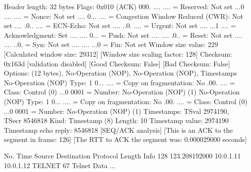     Header length: 32 bytes
    Flags: 0x010 (ACK)
        000. .... .... = Reserved: Not set
        ...0 .... .... = Nonce: Not set
        .... 0... .... = Congestion Window Reduced (CWR): Not set
        .... .0.. .... = ECN-Echo: Not set
        .... ..0. .... = Urgent: Not set
        .... ...1 .... = Acknowledgment: Set
        .... .... 0... = Push: Not set
        .... .... .0.. = Reset: Not set
        .... .... ..0. = Syn: Not set
        .... .... ...0 = Fin: Not set
    Window size value: 229
    [Calculated window size: 29312]
    [Window size scaling factor: 128]
    Checksum: 0x163d [validation disabled]
        [Good Checksum: False]
        [Bad Checksum: False]
    Options: (12 bytes), No-Operation (NOP), No-Operation (NOP), Timestamps
        No-Operation (NOP)
            Type: 1
                0... .... = Copy on fragmentation: No
                .00. .... = Class: Control (0)
                ...0 0001 = Number: No-Operation (NOP) (1)
        No-Operation (NOP)
            Type: 1
                0... .... = Copy on fragmentation: No
                .00. .... = Class: Control (0)
                ...0 0001 = Number: No-Operation (NOP) (1)
        Timestamps: TSval 2974190, TSecr 8546818
            Kind: Timestamp (8)
            Length: 10
            Timestamp value: 2974190
            Timestamp echo reply: 8546818
    [SEQ/ACK analysis]
        [This is an ACK to the segment in frame: 126]
        [The RTT to ACK the segment was: 0.000029000 seconds]

No.     Time           Source                Destination           Protocol Length Info
    128 123.208192000  10.0.1.11             10.0.1.12             TELNET   67     Telnet Data ...

